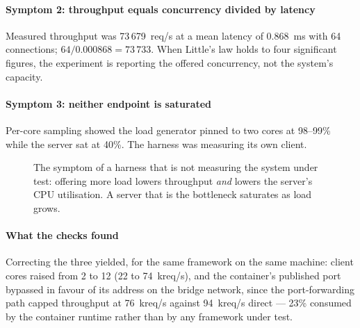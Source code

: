 \documentclass[preprint,12pt]{elsarticle}
\begin{document}
\paragraph{Symptom 2: throughput equals concurrency divided by latency}
Measured throughput was 73\,679~req/s at a mean latency of 0.868~ms with 64
connections; $64/0.000868 = 73\,733$. When Little's law holds to four
significant figures, the experiment is reporting the offered concurrency, not
the system's capacity.

\paragraph{Symptom 3: neither endpoint is saturated}
Per-core sampling showed the load generator pinned to two cores at 98--99\%
while the server sat at 40\%. The harness was measuring its own client.

\begin{figure}[ht]
\centering
{}
\caption{The symptom of a harness that is not measuring the system under test:
         offering more load lowers throughput \emph{and} lowers the server's CPU
         utilisation. A server that is the bottleneck saturates as load grows.}
\label{fig:harness}
\end{figure}

\paragraph{What the checks found}
Correcting the three yielded, for the same framework on the same machine:
client cores raised from 2 to 12 (22 to 74~kreq/s), and the container's
published port bypassed in favour of its address on the bridge network, since
the port-forwarding path capped throughput at 76~kreq/s against 94~kreq/s
direct --- 23\% consumed by the container runtime rather than by any framework
under test.
\end{document}
